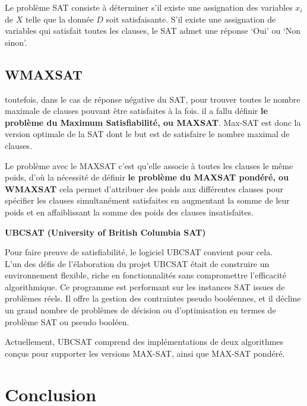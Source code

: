 Le problème SAT consiste à déterminer s’il existe une assignation des variables $x_i$ de $X$ telle que la donnée $D$ soit satisfaisante. S’il existe une assignation de variables qui satisfait toutes les clauses, le SAT admet une réponse ‘Oui’ ou ‘Non sinon’.\cite{hkhallafiThesis}
\subsection{WMAXSAT}

toutefois, dans le cas de réponse négative du SAT, pour trouver toutes le nombre maximale de clauses pouvant être satisfaites à la fois. il a fallu définir \textbf{le problème du Maximum Satisfiabilité, ou MAXSAT}. Max-SAT est donc la version optimale de la SAT dont le but est de satisfaire le nombre maximal de clauses.

Le problème avec le MAXSAT c’est qu’elle associe à toutes les clauses le même poids, d’où la nécessité de définir \textbf{le problème du MAXSAT pondéré, ou WMAXSAT} cela permet d'attribuer des poids aux différentes clauses pour spécifier les clauses simultanément satisfaites en augmentant la somme de leur poids et en affaiblissant la somme des poids des clauses insatisfaites. \cite{hkhallafiThesis}


\textbf{UBCSAT (University of British Columbia SAT)}

Pour faire preuve de satisfiabilité, le logiciel UBCSAT convient pour cela.\\
L'un des défis de l'élaboration du projet UBCSAT était de construire un environnement flexible, riche en fonctionnalités sans compromettre l'efficacité algorithmique. Ce programme est performant sur les instances SAT issues de problèmes réels. Il offre la gestion des contraintes pseudo booléennes, et il décline un grand nombre de problèmes de décision ou d’optimisation en termes de problème SAT ou pseudo booléen.    \cite{hassenThesis}

Actuellement, UBCSAT comprend des implémentations de deux algorithmes conçus pour supporter les versions MAX-SAT, ainsi que MAX-SAT pondéré.

{}
\section*{Conclusion}
